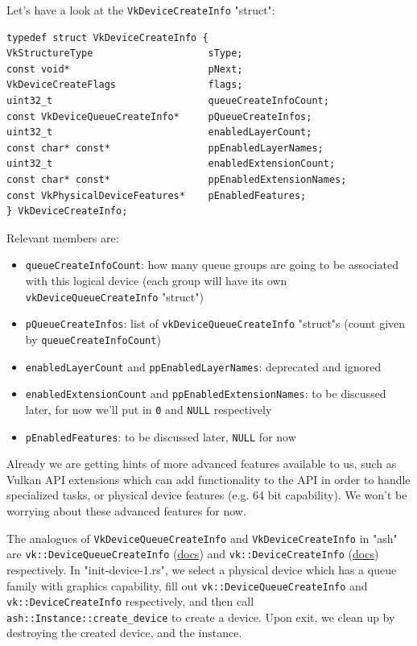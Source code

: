 \documentclass[12pt,letterpaper]{article}
\newcommand{\ril}[1]{\texttt{#1}}
\newcommand{\cil}[1]{\texttt{#1}}
\begin{document}
		Let's have a look at the \cil{VkDeviceCreateInfo} "struct":
\begin{verbatim}
typedef struct VkDeviceCreateInfo {
VkStructureType                    sType;
const void*                        pNext;
VkDeviceCreateFlags                flags;
uint32_t                           queueCreateInfoCount;
const VkDeviceQueueCreateInfo*     pQueueCreateInfos;
uint32_t                           enabledLayerCount;
const char* const*                 ppEnabledLayerNames;
uint32_t                           enabledExtensionCount;
const char* const*                 ppEnabledExtensionNames;
const VkPhysicalDeviceFeatures*    pEnabledFeatures;
} VkDeviceCreateInfo;
\end{verbatim}
		Relevant members are:
			\begin{itemize}
				\item \cil{queueCreateInfoCount}: how many queue groups are going to be associated with this logical device (each group will have its own \cil{vkDeviceQueueCreateInfo} "struct")
				
				\item \cil{pQueueCreateInfos}: list of \cil{vkDeviceQueueCreateInfo} "struct"s 
				(count given by \cil{queueCreateInfoCount})
				
				\item \cil{enabledLayerCount} and \cil{ppEnabledLayerNames}: deprecated and ignored
				
				\item \cil{enabledExtensionCount} and \cil{ppEnabledExtensionNames}: to be discussed later, for now we'll put in \cil{0} and \cil{NULL} respectively
				
				\item \cil{pEnabledFeatures}: to be discussed later, \cil{NULL} for now
			\end{itemize}
		Already we are getting hints of more advanced features available to us, such as Vulkan API extensions which can add functionality to the API in order to handle specialized tasks, or physical device features (e.g. 64 bit capability). We won't be worrying about these advanced features for now.
		
		The analogues of \cil{VkDeviceQueueCreateInfo} and \cil{VkDeviceCreateInfo} in "ash" are \ril{vk::DeviceQueueCreateInfo} (\href{https://docs.rs/ash/0.20.2/ash/vk/types/struct.DeviceQueueCreateInfo.html}{docs}) and \ril{vk::DeviceCreateInfo} (\href{https://docs.rs/ash/0.20.2/ash/vk/types/struct.DeviceCreateInfo.html}{docs}) respectively. In "init-device-1.rs", we select a physical device which has a queue family with graphics capability, fill out \ril{vk::DeviceQueueCreateInfo} and \ril{vk::DeviceCreateInfo} respectively, and then call \ril{ash::Instance::create_device} to create a device. Upon exit, we clean up by destroying the created device, and the instance. 
		
\end{document}
